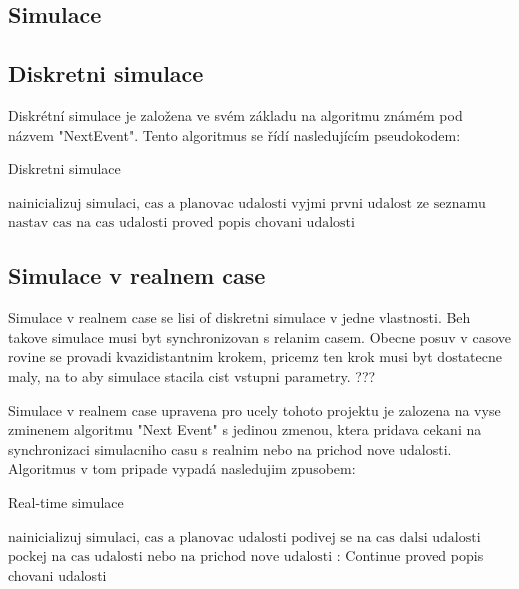 \subsection{Simulace}
\subsection{Diskretni simulace}
Diskrétní simulace je založena ve svém základu na algoritmu známém pod názvem "NextEvent". Tento algoritmus se řídí nasledujícím pseudokodem:
\begin{algorithm}
  \caption{Diskretni simulace}\label{euclid}
  \begin{algorithmic}[1]
  \State $\text{nainicializuj simulaci, cas a planovac udalosti}$
  \State $\text{vyjmi prvni udalost ze seznamu}$
  \Return
  \EndIf
  \State $\text{nastav cas na cas udalosti}$
  \State $\text{proved popis chovani udalosti}$
  \EndWhile
  \end{algorithmic}
  \end{algorithm}
\subsection{Simulace v realnem case}
Simulace v realnem case se lisi of diskretni simulace v jedne vlastnosti. Beh takove simulace musi byt synchronizovan s relanim casem. Obecne posuv v casove rovine se provadi kvazidistantnim krokem, pricemz ten krok musi byt dostatecne maly, na to aby simulace stacila cist vstupni parametry. ??? %

Simulace v realnem case upravena pro ucely tohoto projektu je zalozena na vyse zminenem algoritmu "Next Event" s jedinou zmenou, ktera pridava cekani na synchronizaci simulacniho casu s realnim nebo na prichod nove udalosti. Algoritmus v tom pripade vypadá nasledujim zpusobem:

\begin{algorithm}
\caption{Real-time simulace}\label{euclid}
\begin{algorithmic}[1]
\State $\text{nainicializuj simulaci, cas a planovac udalosti}$
\State $\text{podivej se na cas dalsi udalosti}$
\Return
\EndIf
\State $\text{pockej na cas udalosti nebo na prichod nove udalosti}$
:
    \State Continue
\EndIf
\State proved popis chovani udalosti
\EndWhile
\end{algorithmic}
\end{algorithm}

